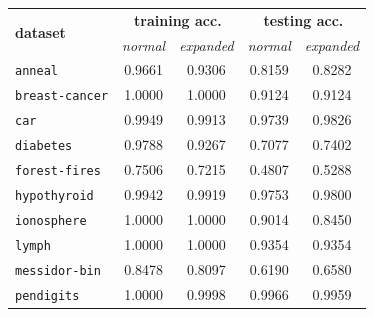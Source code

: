 \documentclass[12pt]{report}
\theoremstyle{definition}
\theoremstyle{definition}
\theoremstyle{definition}
\begin{document}
\begin{table}[ht]
    \centering
    \begin{tabular}{lcccc}
    \hline
    \multicolumn{1}{l}{\multirow{2}{*}{\bf dataset}} & \multicolumn{2}{c}{\bf training acc.} & \multicolumn{2}{c}{\bf testing acc.} \\
    \multicolumn{1}{l}{} & \multicolumn{1}{p{2cm}}{\centering \it normal} & \multicolumn{1}{p{2cm}}{\centering \it expanded} & \multicolumn{1}{p{2cm}}{\centering \it normal} & \multicolumn{1}{p{2cm}}{\centering \it expanded} \\
    \hline
    \multicolumn{1}{l}{\tt anneal}        & \multicolumn{1}{c}{0.9661} & \multicolumn{1}{c}{0.9306} & \multicolumn{1}{c}{0.8159} & \multicolumn{1}{c}{0.8282} \\
    \multicolumn{1}{l}{\tt breast-cancer} & \multicolumn{1}{c}{1.0000} & \multicolumn{1}{c}{1.0000} & \multicolumn{1}{c}{0.9124} & \multicolumn{1}{c}{0.9124} \\
    \multicolumn{1}{l}{\tt car}           & \multicolumn{1}{c}{0.9949} & \multicolumn{1}{c}{0.9913} & \multicolumn{1}{c}{0.9739} & \multicolumn{1}{c}{0.9826} \\
    \multicolumn{1}{l}{\tt diabetes}      & \multicolumn{1}{c}{0.9788} & \multicolumn{1}{c}{0.9267} & \multicolumn{1}{c}{0.7077} & \multicolumn{1}{c}{0.7402} \\
    \multicolumn{1}{l}{\tt forest-fires}  & \multicolumn{1}{c}{0.7506} & \multicolumn{1}{c}{0.7215} & \multicolumn{1}{c}{0.4807} & \multicolumn{1}{c}{0.5288} \\
    \multicolumn{1}{l}{\tt hypothyroid}   & \multicolumn{1}{c}{0.9942} & \multicolumn{1}{c}{0.9919} & \multicolumn{1}{c}{0.9753} & \multicolumn{1}{c}{0.9800} \\
    \multicolumn{1}{l}{\tt ionosphere}    & \multicolumn{1}{c}{1.0000} & \multicolumn{1}{c}{1.0000} & \multicolumn{1}{c}{0.9014} & \multicolumn{1}{c}{0.8450} \\
    \multicolumn{1}{l}{\tt lymph}         & \multicolumn{1}{c}{1.0000} & \multicolumn{1}{c}{1.0000} & \multicolumn{1}{c}{0.9354} & \multicolumn{1}{c}{0.9354} \\
    \multicolumn{1}{l}{\tt messidor-bin}  & \multicolumn{1}{c}{0.8478} & \multicolumn{1}{c}{0.8097} & \multicolumn{1}{c}{0.6190} & \multicolumn{1}{c}{0.6580} \\
    \multicolumn{1}{l}{\tt pendigits}     & \multicolumn{1}{c}{1.0000} & \multicolumn{1}{c}{0.9998} & \multicolumn{1}{c}{0.9966} & \multicolumn{1}{c}{0.9959} \\

\end{tabular}
\end{table}
\end{document}
